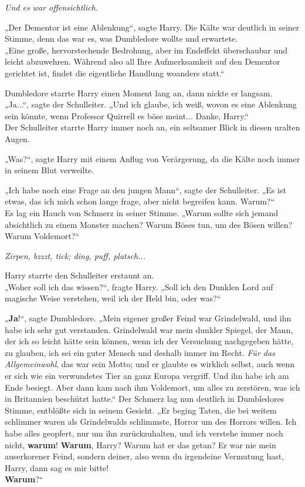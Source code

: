 {\emph{Und es war offensichtlich.}

„Der Dementor ist eine Ablenkung“, sagte Harry. Die Kälte war deutlich in seiner Stimme, denn das war es, was Dumbledore wollte und erwartete.\\ „Eine große, hervorstechende Bedrohung, aber im Endeffekt überschaubar und leicht abzuwehren. Während also all Ihre Aufmerksamkeit auf den Dementor gerichtet ist, findet die eigentliche Handlung woanders statt.“

Dumbledore starrte Harry einen Moment lang an, dann nickte er langsam.\\ „Ja...“, sagte der Schulleiter. „Und ich glaube, ich weiß, wovon es eine Ablenkung sein könnte, wenn Professor Quirrell es böse meint... Danke, Harry.“\\ Der Schulleiter starrte Harry immer noch an, ein seltsamer Blick in diesen uralten Augen.

„Was?“, sagte Harry mit einem Anflug von Verärgerung, da die Kälte noch immer in seinem Blut verweilte.

„Ich habe noch eine Frage an den jungen Mann“, sagte der Schulleiter. „Es ist etwas, das ich mich schon lange frage, aber nicht begreifen kann. Warum?“\\ Es lag ein Hauch von Schmerz in seiner Stimme. „Warum sollte sich jemand absichtlich zu einem Monster machen? Warum Böses tun, um des Bösen willen? Warum Voldemort?“

\emph{Zirpen, bzzzt, tick; ding, puff, platsch...}

Harry starrte den Schulleiter erstaunt an.\\ „Woher soll ich das wissen?“, fragte Harry. „Soll ich den Dunklen Lord auf magische Weise verstehen, weil ich der Held bin, oder was?“

„\textbf{Ja}!“, sagte Dumbledore. „Mein eigener großer Feind war Grindelwald, und ihn habe ich sehr gut verstanden. Grindelwald war mein dunkler Spiegel, der Mann, der ich so leicht hätte sein können, wenn ich der Versuchung nachgegeben hätte, zu glauben, ich sei ein guter Mensch und deshalb immer im Recht. \emph{Für das Allgemeinwohl}, das war sein Motto; und er glaubte es wirklich selbst, auch wenn er sich wie ein verwundetes Tier an ganz Europa vergriff. Und ihn habe ich am Ende besiegt. Aber dann kam nach ihm Voldemort, um alles zu zerstören, was ich in Britannien beschützt hatte.“ Der Schmerz lag nun deutlich in Dumbledores Stimme, entblößte sich in seinem Gesicht. „Er beging Taten, die bei weitem schlimmer waren als Grindelwalds schlimmste, Horror um des Horrors willen. Ich habe alles geopfert, nur um ihn zurückzuhalten, und ich verstehe immer noch nicht, \textbf{warum}! \textbf{Warum}, Harry? Warum hat er das getan? Er war nie mein auserkorener Feind, sondern deiner, also wenn du irgendeine Vermutung hast, Harry, dann sag es mir bitte!\\ \textbf{Warum}?“

}
